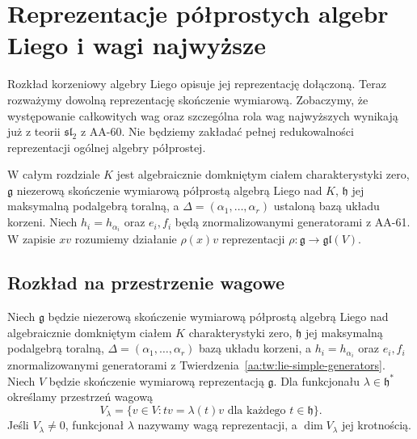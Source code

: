 \chapter[Wagi najwyższe]{Reprezentacje półprostych algebr Liego i wagi najwyższe}
\label{aa:ch:lie-highest-weights}

Rozkład korzeniowy algebry Liego opisuje jej reprezentację dołączoną. Teraz rozważymy dowolną reprezentację skończenie wymiarową. Zobaczymy, że występowanie całkowitych wag oraz szczególna rola wag najwyższych wynikają już z teorii $\mathfrak{sl}_2$ z AA-60. Nie będziemy zakładać pełnej redukowalności reprezentacji ogólnej algebry półprostej.

W całym rozdziale $K$ jest algebraicznie domkniętym ciałem charakterystyki zero, $\mathfrak g$ niezerową skończenie wymiarową półprostą algebrą Liego nad $K$, $\mathfrak h$ jej maksymalną podalgebrą toralną, a $\Delta=(\alpha_1,\ldots,\alpha_r)$ ustaloną bazą układu korzeni. Niech $h_i=h_{\alpha_i}$ oraz $e_i,f_i$ będą znormalizowanymi generatorami z AA-61. W zapisie $xv$ rozumiemy działanie $\rho(x)v$ reprezentacji $\rho:\mathfrak g\to\mathfrak{gl}(V)$.

\section{Rozkład na przestrzenie wagowe}

\begin{definicja}
\label{aa:def:lie-module-weight}
Niech $\mathfrak g$ będzie niezerową skończenie wymiarową półprostą algebrą Liego nad algebraicznie domkniętym ciałem $K$ charakterystyki zero, $\mathfrak h$ jej maksymalną podalgebrą toralną, $\Delta=(\alpha_1,\ldots,\alpha_r)$ bazą układu korzeni, a $h_i=h_{\alpha_i}$ oraz $e_i,f_i$ znormalizowanymi generatorami z Twierdzenia~\ref{aa:tw:lie-simple-generators}. Niech $V$ będzie skończenie wymiarową reprezentacją $\mathfrak g$. Dla funkcjonału $\lambda\in\mathfrak h^*$ określamy przestrzeń wagową
\[
 V_\lambda=\{v\in V:tv=\lambda(t)v\text{ dla każdego }t\in\mathfrak h\}.
\]
Jeśli $V_\lambda\ne0$, funkcjonał $\lambda$ nazywamy wagą reprezentacji, a $\dim V_\lambda$ jej krotnością.
\end{definicja}

